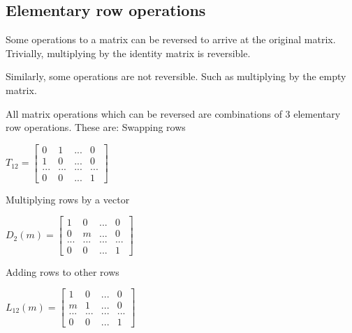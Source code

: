
\subsection{Elementary row operations}

Some operations to a matrix can be reversed to arrive at the original matrix. Trivially, multiplying by the identity matrix is reversible.

Similarly, some operations are not reversible. Such as multiplying by the empty matrix.

All matrix operations which can be reversed are combinations of \(3\) elementary row operations. These are:
Swapping rows

\(T_{12}=\begin{bmatrix}0& 1&...&0\\1 & 0&...&0\\...&...&...&...\\0&0&...&1\end{bmatrix}\)

Multiplying rows by a vector

\(D_2(m)=\begin{bmatrix}1& 0&...&0\\0 & m&...&0\\...&...&...&...\\0&0&...&1\end{bmatrix}\)

Adding rows to other rows

\(L_{12}(m)=\begin{bmatrix}1& 0&...&0\\m & 1&...&0\\...&...&...&...\\0&0&...&1\end{bmatrix}\)
